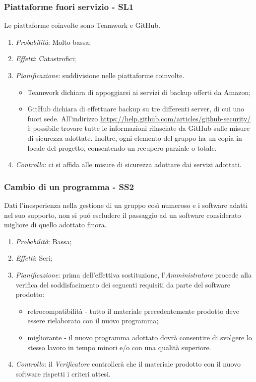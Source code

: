 \subsubsection{Piattaforme fuori servizio - SL1}
Le piattaforme coinvolte sono Teamwork e GitHub.
\begin{enumerate}
\item \textit{Probabilit\`a}: Molto bassa;
\item \textit{Effetti}: Catastrofici;
\item \textit{Pianificazione}: suddivisione nelle piattaforme coinvolte.
  \begin{itemize}
    \item Teamwork dichiara di appoggiarsi ai servizi di backup offerti da Amazon;
    \item GitHub dichiara di effettuare backup su tre differenti server, di cui uno fuori sede. All'indirizzo \href{https://help.github.com/articles/github-security/}{https://help.github.com/articles/github-security/} \`e possibile trovare tutte le informazioni rilasciate da GitHub sulle misure di sicurezza adottate. Inoltre, ogni elemento del gruppo ha un copia in locale del progetto, consentendo un recupero parziale o totale.
  \end{itemize}
\item \textit{Controllo}: ci si affida alle misure di sicurezza adottare dai servizi adottati.
\end{enumerate}

\subsubsection{Cambio di un programma - SS2}
Dati l'inesperienza nella gestione di un gruppo cos\`i numeroso e i software adatti nel suo supporto, non si pu\'o escludere il passaggio ad un software considerato migliore di quello adottato finora.
\begin{enumerate}
\item \textit{Probabilit\`a}: Bassa;
\item \textit{Effetti}: Seri;
\item \textit{Pianificazione}: prima dell'effettiva sostituzione, l'\textit{Amministratore} procede alla verifica del soddisfacimento dei seguenti requisiti da parte del software prodotto:
  \begin{itemize}
    \item retrocompatibilit\`a - tutto il materiale precedentemente prodotto deve essere rielaborato con il nuovo programma;
    \item migliorante - il nuovo programma adottato dovr\`a consentire di svolgere lo stesso lavoro in tempo minori e/o con una qualit\`a superiore.
  \end{itemize}
\item \textit{Controllo}: il \textit{Verificatore} controller\`a che il materiale prodotto con il nuovo software rispetti i criteri attesi.
\end{enumerate}

